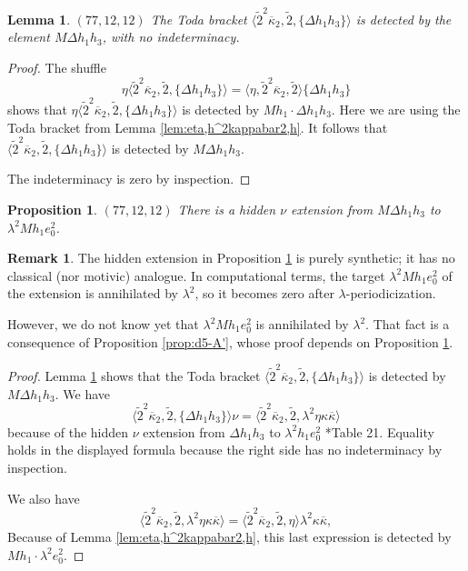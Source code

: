 \documentclass{amsart}
\newtheorem{lemma}[thm]{Lemma}
\newtheorem{prop}[thm]{Proposition}
\theoremstyle{definition}
\newtheorem{rmk}[thm]{Remark}
\newcommand{\hsf}{\widetilde{2}}
\newcommand{\lemdeg}[1]{$({#1})$}
\newcommand{\D}{\Delta}
\newcommand{\kappabar}{\overline{\kappa}}
\begin{document}
\begin{lemma}
\label{lem:h^2kappabar2,h,Dh1h3}
\lemdeg{77, 12, 12}
The Toda bracket
$\langle \hsf^2 \kappabar_2, \hsf, \{\D h_1 h_3\} \rangle$
is detected by the element $M \D h_1 h_3$, with no indeterminacy.
\end{lemma}

\begin{proof}
The shuffle
\[
\eta \langle \hsf^2 \kappabar_2, \hsf, \{\D h_1 h_3\} \rangle =
\langle \eta, \hsf^2 \kappabar_2, \hsf \rangle \{\D h_1 h_3\}
\]
shows that 
$\eta \langle \hsf^2 \kappabar_2, \hsf, \{\D h_1 h_3\} \rangle$
is detected by $M h_1 \cdot \D h_1 h_3$.  
Here we are using the Toda bracket from Lemma \ref{lem:eta,h^2kappabar2,h}.
It follows that
$\langle \hsf^2 \kappabar_2, \hsf, \{\D h_1 h_3\} \rangle$
is detected by $M \D h_1 h_3$.

The indeterminacy is zero by inspection.
\end{proof}

\begin{prop}
\label{prop:nu-MDh1h3}
\lemdeg{77, 12, 12}
There is a hidden $\nu$ extension from 
$M \D h_1 h_3$ to $\lambda^2 M h_1 e_0^2$.
\end{prop}

\begin{rmk}
\label{rmk:nu-MDh1h3}
The hidden extension in Proposition \ref{prop:nu-MDh1h3}
is purely synthetic; it has no classical (nor motivic) analogue.
In computational terms, the target $\lambda^2 M h_1 e_0^2$ of the extension
is annihilated by $\lambda^2$, so it becomes zero after
$\lambda$-periodicization.

However, we do not know yet that $\lambda^2 M h_1 e_0^2$ is 
annihilated by $\lambda^2$.  That fact is a consequence
of Proposition \ref{prop:d5-A'}, whose proof depends on
Proposition \ref{prop:nu-MDh1h3}.
\end{rmk}

\begin{proof}
Lemma \ref{lem:h^2kappabar2,h,Dh1h3} shows that
the Toda bracket
$\langle \hsf^2 \kappabar_2, \hsf, \{\D h_1 h_3\} \rangle$ is detected
by $M \D h_1 h_3$.
We have
\[
\langle \hsf^2 \kappabar_2, \hsf, \{\D h_1 h_3\} \rangle \nu =
\langle \hsf^2 \kappabar_2, \hsf, \lambda^2 \eta \kappa \kappabar \rangle
\]
because of the hidden $\nu$ extension from $\D h_1 h_3$ to
$\lambda^2 h_1 e_0^2$ \cite{IWX}*{Table 21}.  
Equality holds in the displayed formula because the right side
has no indeterminacy by inspection.

We also have
\[
\langle \hsf^2 \kappabar_2, \hsf, \lambda^2 \eta \kappa \kappabar \rangle =
\langle \hsf^2 \kappabar_2, \hsf, \eta \rangle \lambda^2 \kappa \kappabar,
\]
Because of Lemma \ref{lem:eta,h^2kappabar2,h},
this last expression is detected by $M h_1 \cdot \lambda^2 e_0^2$.
\end{proof}
\end{document}

